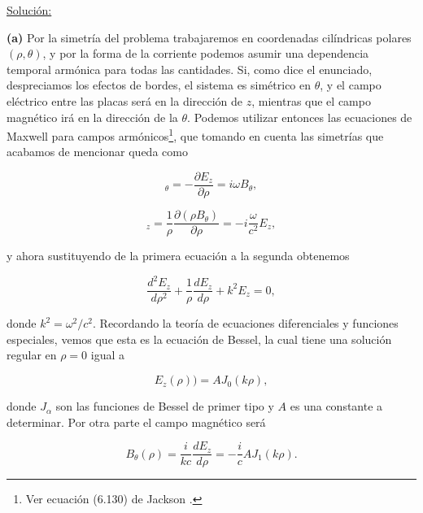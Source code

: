 \documentclass[a4paper,11pt]{article}
\numberwithin{equation}{section}
\begin{document}
\vspace{.3cm}

\underline{Solución:} \vspace{.3cm}

\textbf{(a)} Por la simetría del problema trabajaremos en coordenadas cilíndricas polares $(\rho,\theta)$,
y por la forma de la corriente podemos asumir una dependencia temporal armónica 
para todas las cantidades. Si, como dice el enunciado, despreciamos los efectos 
de bordes, el sistema es simétrico en $\theta$, y el campo eléctrico entre las 
placas será en la dirección de $z$, mientras que el campo magnético irá en 
la dirección de la $\theta$. Podemos utilizar entonces las ecuaciones de Maxwell 
para campos armónicos\footnote{Ver ecuación (6.130) de Jackson \cite{jackson}.}, 
que tomando en cuenta las simetrías que acabamos de mencionar queda como 

\begin{equation}
 [\pmb{\nabla} \times \mathbf{E}]_\theta = - \frac{\partial E_z}{\partial \rho} = 
 i\omega B_\theta,
\end{equation}

\begin{equation}
 [\pmb{\nabla} \times \mathbf{B}]_z = \frac{1}{\rho}
 \frac{\partial (\rho B_\theta)} {\partial \rho} = - i\frac{\omega}{c^2}E_z,
\end{equation}

y ahora sustituyendo de la primera ecuación a la segunda obtenemos 

\begin{equation}
 \frac{d^2E_z}{d\rho^2} + \frac{1}{\rho}\frac{dE_z}{d\rho} + k^2E_z = 0,
\end{equation}

donde $k^2 = \omega^2/c^2$. Recordando la teoría de ecuaciones diferenciales y 
funciones especiales, vemos que esta es la ecuación de Bessel, la cual tiene 
una solución regular en $\rho=0$ igual a 

\begin{equation}
 E_z(\rho) ) = AJ_0(k\rho),
\end{equation}

donde $J_\alpha$ son las funciones de Bessel de primer tipo y $A$ es una constante 
a determinar. Por otra parte el campo magnético será 

\begin{equation}
 B_\theta(\rho) = \frac{i}{kc}\frac{dE_z}{d\rho} = - \frac{i}{c}AJ_1(k\rho).
\end{equation}
\end{document}
